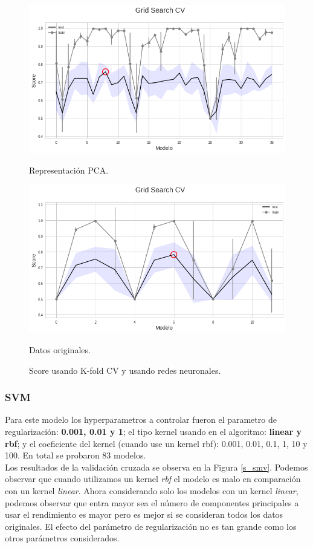 \documentclass[paper=letter, fontsize=11pt]{scrartcl}
\numberwithin{equation}{section} %
\numberwithin{figure}{section} %
\numberwithin{table}{section} %
\begin{document}
\begin{figure}[!htb]
  \includegraphics[width=\linewidth]{figure/s_redes_pca.png}
  \caption{Representación PCA.}\label{act}
\endminipage\hfill
{}
  \includegraphics[width=\linewidth]{figure/s_redes.png}\caption{Datos originales.}\label{arqui}
\endminipage
\caption{Score usando K-fold CV y usando redes neuronales.}\label{s_redes}
\end{figure}


\subsubsection*{SVM}
Para este modelo los hyperparametros a controlar fueron el parametro de regularización: \textbf{0.001, 0.01 y 1};   el tipo kernel usando en el algoritmo: \textbf{linear y rbf}; y el coeficiente del kernel (cuando use un kernel rbf): 0.001, 0.01, 0.1, 1, 10 y 100. En total se probaron 83 modelos.\\

Los resultados de la validación cruzada se observa en la Figura \ref{s_smv}. Podemos observar que cuando utilizamos un kernel \textit{rbf} el modelo es malo en comparación con un kernel \textit{linear}. Ahora considerando solo los modelos con un kernel \textit{linear}, podemos observar que entra mayor sea el número de componentes principales a usar el rendimiento es mayor pero es mejor si se consideran todos los datos originales. El efecto del  parámetro de regularización no es tan grande como los otros parámetros considerados. 
\end{document}
